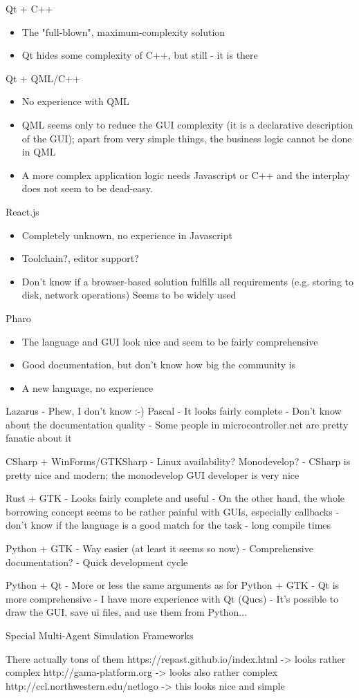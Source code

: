 Qt + C++
\begin{itemize}
	\item The "full-blown", maximum-complexity solution
	\item Qt hides some complexity of C++, but still - it is there
\end{itemize}


Qt + QML/C++
\begin{itemize}
	\item No experience with QML
	\item QML seems only to reduce the GUI complexity (it is a declarative description of the GUI); apart from very simple things, the business logic cannot be done in QML
	\item A more complex application logic needs Javascript or C++ and the interplay does not seem to be dead-easy.
\end{itemize}


React.js
\begin{itemize}
	\item Completely unknown, no experience in Javascript
	\item Toolchain?, editor support?
	\item Don't know if a browser-based solution fulfills all requirements (e.g. storing to disk, network operations)
	Seems to be widely used
\end{itemize}

Pharo
\begin{itemize}
	\item The language and GUI look nice and seem to be fairly comprehensive
	\item Good documentation, but don't know how big the community is
	\item A new language, no experience
\end{itemize}


Lazarus
- Phew, I don't know :-) Pascal
- It looks fairly complete
- Don't know about the documentation quality
- Some people in microcontroller.net are pretty fanatic about it

CSharp + WinForms/GTKSharp
- Linux availability? Monodevelop?
- CSharp is pretty nice and modern; the monodevelop GUI developer is very nice

Rust + GTK
- Looks fairly complete and useful
- On the other hand, the whole borrowing concept seems to be rather painful with GUIs, especially callbacks
- don't know if the language is a good match for the task
- long compile times

Python + GTK
- Way easier (at least it seems so now)
- Comprehensive documentation?
- Quick development cycle

Python + Qt
- More or less the same arguments as for Python + GTK
- Qt is more comprehensive
- I have more experience with Qt (Qucs)
- It's possible to draw the GUI, save ui files, and use them from Python...

Special Multi-Agent Simulation Frameworks

There actually tons of them
https://repast.github.io/index.html -> looks rather complex
http://gama-platform.org -> looks also rather complex
http://ccl.northwestern.edu/netlogo -> this looks nice and simple




